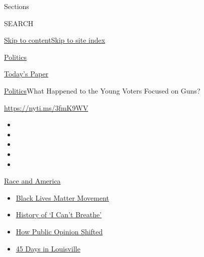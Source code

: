 Sections

SEARCH

\protect\hyperlink{site-content}{Skip to
content}\protect\hyperlink{site-index}{Skip to site index}

\href{https://www.nytimes.com/section/politics}{Politics}

\href{https://myaccount.nytimes.com/auth/login?response_type=cookie\&client_id=vi}{}

\href{https://www.nytimes.com/section/todayspaper}{Today's Paper}

\href{/section/politics}{Politics}\textbar{}What Happened to the Young
Voters Focused on Guns?

\url{https://nyti.ms/3fmK9WV}

\begin{itemize}
\item
\item
\item
\item
\item
\end{itemize}

\href{https://www.nytimes.com/news-event/george-floyd-protests-minneapolis-new-york-los-angeles?action=click\&pgtype=Article\&state=default\&region=TOP_BANNER\&context=storylines_menu}{Race
and America}

\begin{itemize}
\tightlist
\item
  \href{https://www.nytimes.com/interactive/2020/07/03/us/george-floyd-protests-crowd-size.html?action=click\&pgtype=Article\&state=default\&region=TOP_BANNER\&context=storylines_menu}{Black
  Lives Matter Movement}
\item
  \href{https://www.nytimes.com/interactive/2020/06/28/us/i-cant-breathe-police-arrest.html?action=click\&pgtype=Article\&state=default\&region=TOP_BANNER\&context=storylines_menu}{History
  of `I Can't Breathe'}
\item
  \href{https://www.nytimes.com/interactive/2020/06/10/upshot/black-lives-matter-attitudes.html?action=click\&pgtype=Article\&state=default\&region=TOP_BANNER\&context=storylines_menu}{How
  Public Opinion Shifted}
\item
  \href{https://www.nytimes.com/interactive/2020/07/16/us/black-lives-matter-protests-louisville-breonna-taylor.html?action=click\&pgtype=Article\&state=default\&region=TOP_BANNER\&context=storylines_menu}{45
  Days in Louisville}
\end{itemize}

